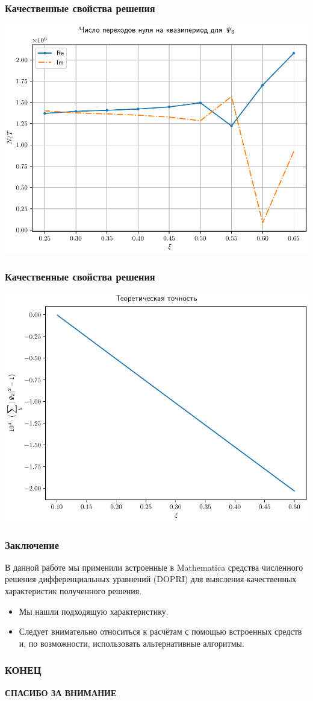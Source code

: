 \documentclass[utf8,9pt,mathserif,usepdftitle=false]{beamer}
\begin{document}
\begin{frame}
	\frametitle{Качественные свойства решения}%
	\includegraphics[width=\linewidth]{psi3-rel-trans-ru}
\end{frame}

\begin{frame}
  \frametitle{Качественные свойства решения}%
  \includegraphics[width=\linewidth]{control-scaled}
\end{frame}

\begin{frame}
  \frametitle{Заключение}%
  В данной работе мы применили встроенные в Mathematica средства численного
  решения дифференциальных уравнений (DOPRI) для выясления качественных
  характеристик полученного решения.
  \begin{itemize}
  \item<1-> Мы нашли подходящую характеристику.
  \item<2->Следует внимательно относиться к расчётам с помощью встроенных средств
  и, по возможности, использовать альтернативные алгоритмы.
  \end{itemize}
\end{frame}

\begin{frame}
  \frametitle{КОНЕЦ}%
  \LARGE%
  \centering%
  \bfseries%
  СПАСИБО ЗА ВНИМАНИЕ%
\end{frame}
\end{document}
